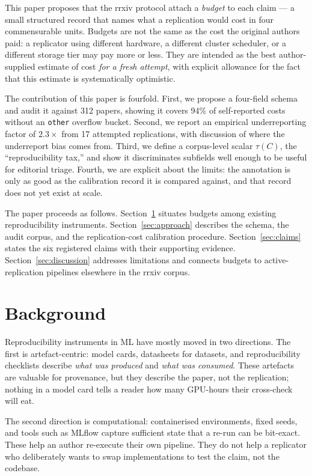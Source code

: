 \documentclass{rrxiv}
\begin{document}
This paper proposes that the rrxiv protocol attach a \emph{budget} to each claim --- a small structured record that names what a replication would cost in four commensurable units. Budgets are not the same as the cost the original authors paid: a replicator using different hardware, a different cluster scheduler, or a different storage tier may pay more or less. They are intended as the best author-supplied estimate of cost \emph{for a fresh attempt}, with explicit allowance for the fact that this estimate is systematically optimistic.

The contribution of this paper is fourfold. First, we propose a four-field schema and audit it against 312 papers, showing it covers 94\% of self-reported costs without an \texttt{other} overflow bucket. Second, we report an empirical underreporting factor of $2.3\times$ from 17 attempted replications, with discussion of where the underreport bias comes from. Third, we define a corpus-level scalar $\tau(C)$, the ``reproducibility tax,'' and show it discriminates subfields well enough to be useful for editorial triage. Fourth, we are explicit about the limits: the annotation is only as good as the calibration record it is compared against, and that record does not yet exist at scale.

The paper proceeds as follows. Section~\ref{sec:background} situates budgets among existing reproducibility instruments. Section~\ref{sec:approach} describes the schema, the audit corpus, and the replication-cost calibration procedure. Section~\ref{sec:claims} states the six registered claims with their supporting evidence. Section~\ref{sec:discussion} addresses limitations and connects budgets to active-replication pipelines elsewhere in the rrxiv corpus.

\section{Background}\label{sec:background}

Reproducibility instruments in ML have mostly moved in two directions. The first is artefact-centric: model cards, datasheets for datasets, and reproducibility checklists describe \emph{what was produced} and \emph{what was consumed}. These artefacts are valuable for provenance, but they describe the paper, not the replication; nothing in a model card tells a reader how many GPU-hours their cross-check will eat.

The second direction is computational: containerised environments, fixed seeds, and tools such as MLflow capture sufficient state that a re-run can be bit-exact. These help an author re-execute their own pipeline. They do not help a replicator who deliberately wants to swap implementations to test the claim, not the codebase.
\end{document}
